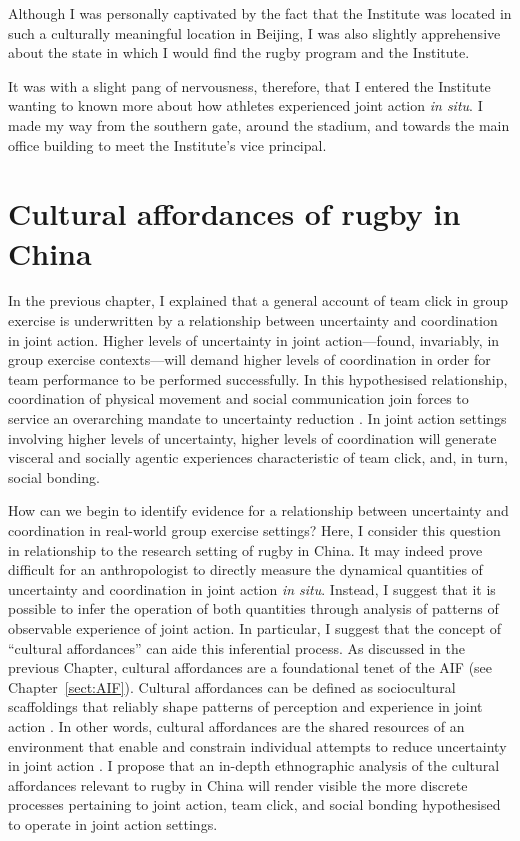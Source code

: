 \begin{CJK}{UTF8}{gbsn}
Although I was personally captivated by the fact that the Institute was located in such a culturally meaningful location in Beijing, I was also slightly apprehensive about the state in which I would find the rugby program and the Institute.

It was with a slight pang of nervousness, therefore, that I entered the Institute wanting to known more about how athletes experienced joint action \textit{in situ}.  I made my way from the southern gate, around the stadium, and towards the main office building to meet the Institute's vice principal.


\section{Cultural affordances of rugby in China}
In the previous chapter, I explained that a general account of team click in group exercise is underwritten by a relationship between uncertainty and coordination in joint action.  Higher levels of uncertainty in joint action—found, invariably, in group exercise contexts—will demand higher levels of coordination in order for team performance to be performed successfully.  In this hypothesised relationship, coordination of physical movement and social communication join forces to service an overarching mandate to uncertainty reduction \citep{Friston2015,Clark2015}.  In joint action settings involving higher levels of uncertainty, higher levels of coordination will generate visceral and socially agentic experiences characteristic of team click, and, in turn, social bonding.

How can we begin to identify evidence for a relationship between uncertainty and coordination in real-world group exercise settings?  Here, I consider this question in relationship to the research setting of rugby in China.  It may indeed prove difficult for an anthropologist to directly measure the dynamical quantities of uncertainty and coordination in joint action \textit{in situ}.  Instead, I suggest that it is possible to infer the operation of both quantities through analysis of patterns of observable experience of joint action.  In particular, I suggest that the concept of ``cultural affordances'' can aide this inferential process.  As discussed in the previous Chapter, cultural affordances are a foundational tenet of the AIF (see Chapter~\ref{sect:AIF}).   Cultural affordances can be defined as sociocultural scaffoldings that reliably shape patterns of perception and experience in joint action \citep{Ramstead2016}.  In other words, cultural affordances are the shared resources of an environment that enable and constrain individual attempts to reduce uncertainty in joint action \citep{Friston2012}.  I propose that an in-depth ethnographic analysis of the cultural affordances relevant to rugby in China will render visible the more discrete processes pertaining to joint action, team click, and social bonding hypothesised to operate in joint action settings.


\end{CJK}
